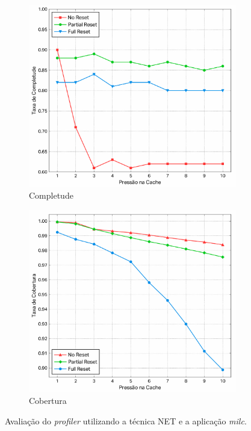 \documentclass[12pt,twoside]{article}
\begin{document}
\begin{figure}[!ht]
        \centering
        \begin{subfigure}[b]{0.48\textwidth}
                \includegraphics[width=\textwidth]{./figs/reset-completion-ratio}
                \caption{Completude}
                \label{fig-completude1}
        \end{subfigure}
        \quad 
                \begin{subfigure}[b]{0.48\textwidth}
                \includegraphics[width=\textwidth]{./figs/reset-dynamic-cov}
                \caption{Cobertura}
                \label{fig-cobertura1}
        \end{subfigure}
\caption{Avaliação do \emph{profiler} utilizando a técnica NET e a aplicação \emph{milc}.}
\end{figure}
\end{document}
